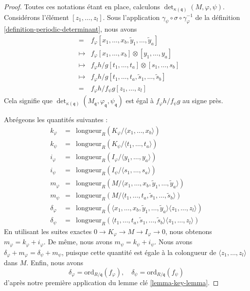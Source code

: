 \begin{proof}
\medskip\noindent
Toutes ces
notations étant en place, calculons $\det_{\kappa(\mathfrak q)}(M, \varphi, \psi)$.
Considérons l'élément $[z_1, \ldots, z_l]$.
Sous l'application $\gamma_\psi \circ \sigma \circ \gamma_\varphi^{-1}$
de la définition \ref{definition-periodic-determinant}, nous avons
\begin{eqnarray*}
[z_1, \ldots, z_l] & = &
f_\varphi [x_1, \ldots, x_b, \tilde y_1, \ldots, \tilde y_a] \\
& \mapsto & f_\varphi [x_1, \ldots, x_b] \otimes [y_1, \ldots, y_a] \\
& \mapsto &
f_\varphi h/g [t_1, \ldots, t_a] \otimes [s_1, \ldots, s_b] \\
& \mapsto &
f_\varphi h/g [t_1, \ldots, t_a, \tilde s_1, \ldots, \tilde s_b] \\
& = &
f_\varphi h/f_\psi g [z_1, \ldots, z_l]
\end{eqnarray*}
Cela signifie que
$\det_{\kappa(\mathfrak q)}
(M_{\mathfrak q}, \varphi_{\mathfrak q}, \psi_{\mathfrak q})$
est égal à $f_\varphi h/f_\psi g$ au signe près.

\medskip\noindent
Abrégeons les quantités suivantes :
\begin{eqnarray*}
k_\varphi & = & \text{longueur}_R(K_\varphi/\langle x_1, \ldots, x_b\rangle) \\
k_\psi    & = & \text{longueur}_R(K_\psi/\langle t_1, \ldots, t_a\rangle) \\
i_\varphi & = & \text{longueur}_R(I_\varphi/\langle y_1, \ldots, y_a\rangle) \\
i_\psi    & = & \text{longueur}_R(I_\psi/\langle s_1, \ldots, s_a\rangle) \\
m_\varphi & = & \text{longueur}_R(M/
\langle x_1, \ldots, x_b, \tilde y_1, \ldots, \tilde y_a\rangle) \\
m_\psi    & = & \text{longueur}_R(M/
\langle t_1, \ldots, t_a, \tilde s_1, \ldots, \tilde s_b\rangle) \\
\delta_\varphi & = & \text{longueur}_R(
\langle x_1, \ldots, x_b, \tilde y_1, \ldots, \tilde y_a\rangle
\langle z_1, \ldots, z_l\rangle) \\
\delta_\psi & = & \text{longueur}_R(
\langle t_1, \ldots, t_a, \tilde s_1, \ldots, \tilde s_b\rangle
\langle z_1, \ldots, z_l\rangle)
\end{eqnarray*}
En utilisant les suites exactes $0 \to K_\varphi \to M \to I_\varphi \to 0$,
nous obtenons $m_\varphi = k_\varphi + i_\varphi$. De même, nous avons
$m_\psi = k_\psi + i_\psi$. Nous avons
$\delta_\varphi + m_\varphi = \delta_\psi + m_\psi$, puisque cette quantité
est égale à la colongueur de $\langle z_1, \ldots, z_l \rangle$
dans $M$. Enfin, nous avons
$$
\delta_\varphi = \text{ord}_{R/\mathfrak q}(f_\varphi),
\quad
\delta_\psi = \text{ord}_{R/\mathfrak q}(f_\psi)
$$
d'après notre première application du lemme clé \ref{lemma-key-lemma}.


\end{proof}
